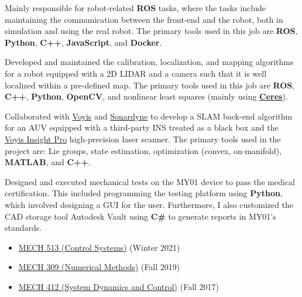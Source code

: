 \documentclass[10pt,letter]{altacv}
\begin{document}
Mainly responsible for robot-related \textbf{ROS} tasks, where the tasks include maintaining the communication between the front-end and the robot, both in simulation and using the real robot.
The primary tools used in this job are \textbf{ROS}, \textbf{Python}, \textbf{C++}, \textbf{JavaScript}, and \textbf{Docker}.

\divider

Developed and maintained the calibration, localization, and mapping algorithms for a robot equipped with a 2D LIDAR and a camera such that it is well localized within a pre-defined map.
The primary tools used in this job are \textbf{ROS}, \textbf{C++}, \textbf{Python}, \textbf{OpenCV}, and nonlinear least squares (mainly using \href{https://github.com/ceres-solver/ceres-solver}{\textbf{Ceres}}).

\divider

Collaborated with \href{https://voyis.com/}{Voyis} and \href{https://www.sonardyne.com/}{Sonardyne} to develop a SLAM back-end algorithm for an AUV equipped with a third-party INS treated as a black box and the \href{https://voyis.com/insight-pro}{Voyis Insight Pro} high-precision laser scanner.
The primary tools used in the project are:
Lie groups, state estimation, optimization (convex, on-manifold), \textbf{MATLAB}, and \textbf{C++}.

\divider

Designed and executed mechanical tests on the MY01 device to pass the medical certification.
This included programming the testing platform using \textbf{Python}, which involved designing a GUI for the user.
Furthermore, I also customized the CAD storage tool Autodesk Vault using \textbf{C\#} to generate reports in MY01's standards.

\divider

\begin{itemize}[noitemsep]
  \item \href{https://www.mcgill.ca/study/2022-2023/courses/mech-513}{MECH 513 (Control Systems)} (Winter 2021)
  \item \href{https://www.mcgill.ca/study/2022-2023/courses/mech-309}{MECH 309 (Numerical Methods)} (Fall 2019)
  \item \href{https://www.mcgill.ca/study/2022-2023/courses/mech-412}{MECH 412 (System Dynamics and Control)} (Fall 2017)
\end{itemize}
\end{document}
